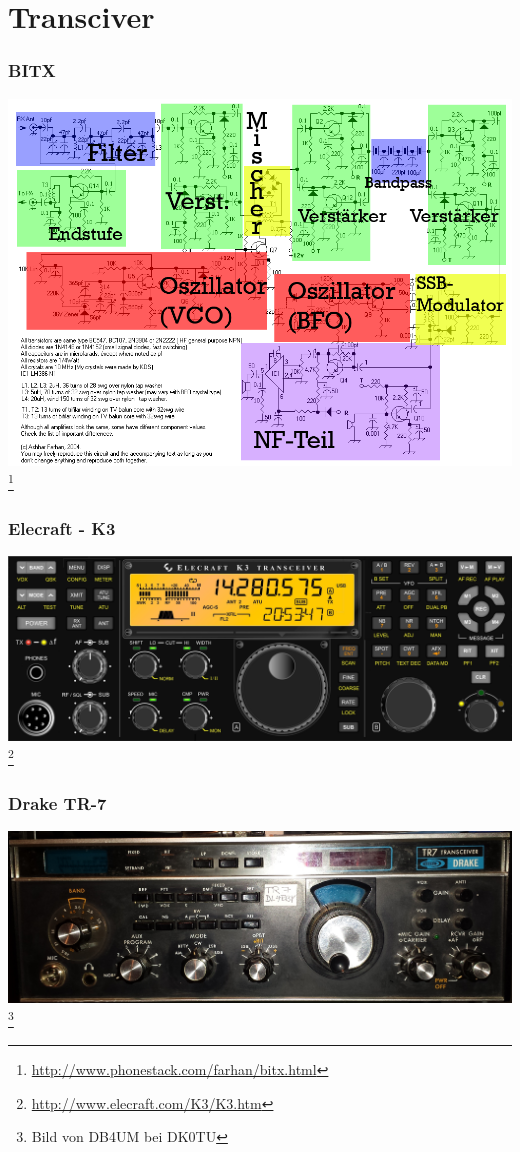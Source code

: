 \section*{Transciver}

\begin{frame}
    \frametitle{BITX}
        \includegraphics[width=1.02\textwidth]{e15/bitx-farbe.png}
        \footnote{\tiny \url{http://www.phonestack.com/farhan/bitx.html}}
\end{frame}

\begin{frame}
    \frametitle{Elecraft - K3}
        \begin{center}
        \includegraphics[width=1.22\textwidth]{e15/K3_Front.jpg}
        \footnote{\tiny \url{http://www.elecraft.com/K3/K3.htm}}
	\end{center}
\end{frame}

\begin{frame}
    \frametitle{Drake TR-7}
        \begin{center}
        \includegraphics[width=1.22\textwidth]{e15/drake.jpg}
        \footnote{\tiny Bild von DB4UM bei DK0TU}
	\end{center}
\end{frame}

